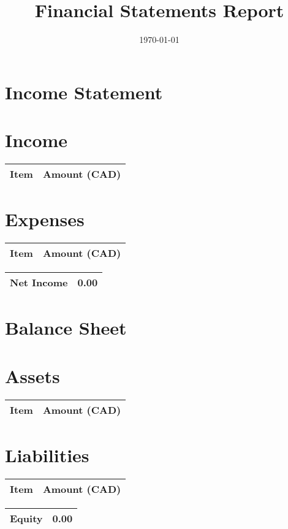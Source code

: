\documentclass{article}
\begin{document}
\title{Financial Statements Report}
\date{\today}
\maketitle

\section*{Income Statement}
\section*{Income}
\begin{tabular}{l r}
\toprule
Item & Amount (CAD) \\
\midrule
\bottomrule
\end{tabular}

\section*{Expenses}
\begin{tabular}{l r}
\toprule
Item & Amount (CAD) \\
\midrule
\bottomrule
\end{tabular}

\begin{tabular}{l r}
\toprule
\textbf{Net Income} & \textbf{0.00} \\
\bottomrule
\end{tabular}

\section*{Balance Sheet}
\section*{Assets}
\begin{tabular}{l r}
\toprule
Item & Amount (CAD) \\
\midrule
\bottomrule
\end{tabular}

\section*{Liabilities}
\begin{tabular}{l r}
\toprule
Item & Amount (CAD) \\
\midrule
\bottomrule
\end{tabular}

\begin{tabular}{l r}
\toprule
\textbf{Equity} & \textbf{0.00} \\
\bottomrule
\end{tabular}
\end{document}
